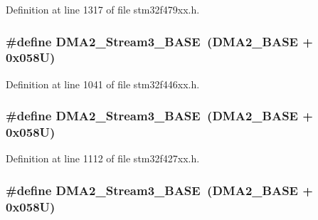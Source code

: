 Definition at line 1317 of file stm32f479xx.\+h.

\subsubsection[{\texorpdfstring{D\+M\+A2\+\_\+\+Stream3\+\_\+\+B\+A\+SE}{DMA2_Stream3_BASE}}]{\setlength{\rightskip}{0pt plus 5cm}\#define D\+M\+A2\+\_\+\+Stream3\+\_\+\+B\+A\+SE~({\bf D\+M\+A2\+\_\+\+B\+A\+SE} + 0x058\+U)}\hypertarget{group___peripheral__memory__map_gaf3a9480e08c6ae94f4482e0cdaebdd17}{}\label{group___peripheral__memory__map_gaf3a9480e08c6ae94f4482e0cdaebdd17}


Definition at line 1041 of file stm32f446xx.\+h.

\subsubsection[{\texorpdfstring{D\+M\+A2\+\_\+\+Stream3\+\_\+\+B\+A\+SE}{DMA2_Stream3_BASE}}]{\setlength{\rightskip}{0pt plus 5cm}\#define D\+M\+A2\+\_\+\+Stream3\+\_\+\+B\+A\+SE~({\bf D\+M\+A2\+\_\+\+B\+A\+SE} + 0x058\+U)}\hypertarget{group___peripheral__memory__map_gaf3a9480e08c6ae94f4482e0cdaebdd17}{}\label{group___peripheral__memory__map_gaf3a9480e08c6ae94f4482e0cdaebdd17}


Definition at line 1112 of file stm32f427xx.\+h.

\subsubsection[{\texorpdfstring{D\+M\+A2\+\_\+\+Stream3\+\_\+\+B\+A\+SE}{DMA2_Stream3_BASE}}]{\setlength{\rightskip}{0pt plus 5cm}\#define D\+M\+A2\+\_\+\+Stream3\+\_\+\+B\+A\+SE~({\bf D\+M\+A2\+\_\+\+B\+A\+SE} + 0x058\+U)}\hypertarget{group___peripheral__memory__map_gaf3a9480e08c6ae94f4482e0cdaebdd17}{}\label{group___peripheral__memory__map_gaf3a9480e08c6ae94f4482e0cdaebdd17}


